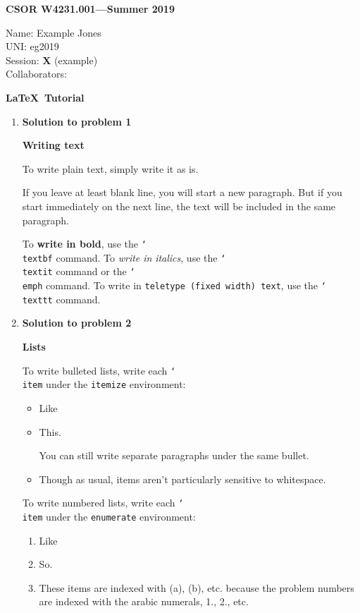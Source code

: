\documentclass[11pt]{article}
\newcommand{\problemitem}[1]{
  \bigskip
  \item {\bf Solution to problem #1}
  \medskip
}
\newcommand{\BACKSLASH}{\char`\\ }
\begin{document}
\begin{flushright}
{\bf CSOR W4231.001---Summer 2019}
\end{flushright}
\begin{flushleft}
  Name: Example Jones\\
  UNI: eg2019\\
  Session: {\bf X} (example) \\ %
  Collaborators: \\ %
\end{flushleft}

\bigskip
\centerline{\bf \LaTeX\ Tutorial}

\begin{enumerate}

\problemitem{1}

{\large \textbf{Writing text}}

To write plain text, simply write it as is.

If you leave at least blank line, you will start a new paragraph.
But if you start immediately on the next line, the text will be included in the
same paragraph.

To \textbf{write in bold}, use the \texttt{\BACKSLASH textbf} command. To
\textit{write in} \emph{italics}, use the \texttt{\BACKSLASH textit} command or the
\texttt{\BACKSLASH emph} command. To write in \texttt{teletype (fixed width)
text}, use the \texttt{\BACKSLASH texttt} command.

\problemitem{2}

{\large \textbf{Lists}}

To write bulleted lists, write each \texttt{\BACKSLASH item} under the
\texttt{itemize} environment:

\begin{itemize}
  \item Like
  \item This.

    You can still write separate paragraphs under the same bullet.
  \item

    Though as usual, items aren't
particularly sensitive
    to whitespace.


\end{itemize}

To write numbered lists, write each \texttt{\BACKSLASH item} under the
\texttt{enumerate} environment:
\begin{enumerate}
  \item Like
  \item So.
  \item These items are indexed with (a), (b), etc. because the problem numbers
    are indexed with the arabic numerals, 1., 2., etc.
\end{enumerate}


\end{enumerate}
\end{document}
